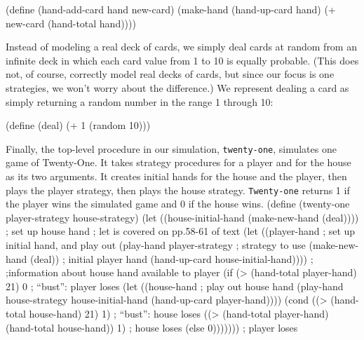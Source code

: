 \beginlisp
(define (hand-add-card hand new-card)
  (make-hand (hand-up-card hand)
             (+ new-card (hand-total hand))))
\endlisp

Instead of modeling a real deck of cards, we simply deal cards at
random from an infinite deck in which each card value from 1 to 10 is
equally probable.  (This does not, of course, correctly model real
decks of cards, but since our focus is one strategies, we won't worry
about the difference.)   We represent dealing a card as simply returning a
random number in the range 1 through 10:

\beginlisp
(define (deal) (+ 1 (random 10)))
\endlisp

Finally, the top-level procedure in our simulation, {\tt twenty-one},
simulates one game of Twenty-One.  It takes strategy procedures for a
player and for the house as its two arguments.  It creates initial
hands for the house and the player, then plays the player strategy,
then plays the house strategy.  {\tt Twenty-one} returns 1 if the
player wins the simulated game and 0 if the house wins.
\beginlisp
(define (twenty-one player-strategy house-strategy)
  (let ((house-initial-hand (make-new-hand (deal))))  ; set up house hand
        ; let is covered on pp.58-61 of text
    (let ((player-hand  ; set up initial hand, and play out
           (play-hand player-strategy  ; strategy to use
                      (make-new-hand (deal))  ; initial player hand
                      (hand-up-card house-initial-hand))))  ;
                            ;information about house hand available to player
      (if (> (hand-total player-hand) 21)
          0                                ; ``bust'': player loses
          (let ((house-hand   ; play out house hand
                 (play-hand house-strategy
                            house-initial-hand
                            (hand-up-card player-hand))))
            (cond ((> (hand-total house-hand) 21)
                   1)                      ; ``bust'': house loses
                  ((> (hand-total player-hand)
                      (hand-total house-hand))
                   1)                      ; house loses
                  (else 0)))))))           ; player loses
\endlisp


